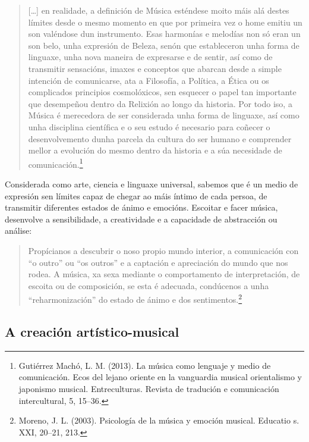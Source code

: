 \documentclass[a4paper, twoside]{templates/ociamthesis}
\begin{document}
\begin{quote}
{[}\ldots{]} en realidade, a definición de Música esténdese moito máis alá destes límites desde o mesmo momento en que por primeira vez o home emitiu un son valéndose dun instrumento. Esas harmonías e melodías non só eran un son belo, unha expresión de Beleza, senón que estableceron unha forma de linguaxe, unha nova maneira de expresarse e de sentir, así como de transmitir sensacións, imaxes e conceptos que abarcan desde a simple intención de comunicarse, ata a Filosofía, a Política, a Ética ou os complicados principios cosmolóxicos, sen esquecer o papel tan importante que desempeñou dentro da Relixión ao longo da historia. Por todo iso, a Música é merecedora de ser considerada unha forma de linguaxe, así como unha disciplina científica e o seu estudo é necesario para coñecer o desenvolvemento dunha parcela da cultura do ser humano e comprender mellor a evolución do mesmo dentro da historia e a súa necesidade de comunicación.\footnote{Gutiérrez Machó, L. M. (2013). La música como lenguaje y medio de comunicación. Ecos del lejano oriente en la vanguardia musical orientalismo y japonismo musical. Entreculturas. Revista de tradución e comunicación intercultural, 5, 15--36.}
\end{quote}

Considerada como arte, ciencia e linguaxe universal, sabemos que é un medio de expresión sen límites capaz de chegar ao máis íntimo de cada persoa, de transmitir diferentes estados de ánimo e emocións. Escoitar e facer música, desenvolve a sensibilidade, a creatividade e a capacidade de abstracción ou análise:

\begin{quote}
Propícianos a descubrir o noso propio mundo interior, a comunicación con ``o outro'' ou ``os outros'' e a captación e apreciación do mundo que nos rodea. A música, xa sexa mediante o comportamento de interpretación, de escoita ou de composición, se esta é adecuada, condúcenos a unha ``reharmonización'' do estado de ánimo e dos sentimentos.\footnote{Moreno, J. L. (2003). Psicología de la música y emoción musical. Educatio s. XXI, 20--21, 213.}
\end{quote}

\hypertarget{a-creaciuxf3n-artuxedstico-musical}{%
\subsection*{A creación artístico-musical}\label{a-creaciuxf3n-artuxedstico-musical}}
\end{document}
